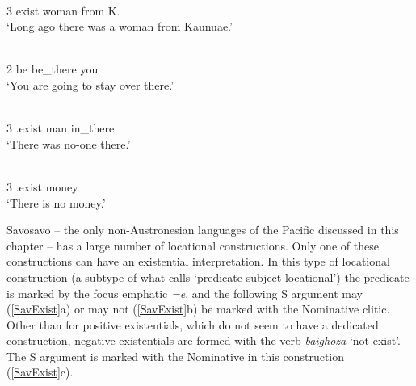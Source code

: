 
\begin{exe}\ex{}
\begin{xlist}
\ex\label{AjiExHum}\gll{}   \textbf{} \textbf{}  \\
3\sg{} exist \pstrem{} \nom{} woman from K.\\
\glt `Long ago there was a woman from Kaunuae.'

\ex\label{AijLoc}\gll{}    \textbf{} \textbf{}\\
2\sg{} \prosp{} be be\_there \nom{} you\\
\glt `You are going to stay over there.'
\end{xlist}
\end{exe}

\begin{exe}\ex\label{AijLoc2}
\begin{xlist}
\ex\gll{}  \textbf{} \\
3\sg{} \Neg{}.exist man in\_there\\
\glt `There was no-one there.' 

\ex\gll{}  \textbf{}\\
3\sg{} \Neg{}.exist money\\
\glt `There is no money.'
\end{xlist}
\end{exe}

Savosavo -- the only non-Austronesian languages of the Pacific discussed in this chapter -- has a large number of locational constructions. 
Only one of these constructions can have an existential interpretation. 
In this type of locational construction (a subtype of what \citet{Wegener:2008} calls `predicate-subject locational') the predicate is marked by the focus emphatic \emph{=e}, and the following S argument may (\ref{SavExist}a) or may not (\ref{SavExist}b) be marked with the Nominative clitic.
Other than for positive existentials, which do not seem to have a dedicated construction, negative existentials are formed with the verb \emph{baighoza} `not exist'. 
The S argument is marked with the Nominative in this construction (\ref{SavExist}c).

